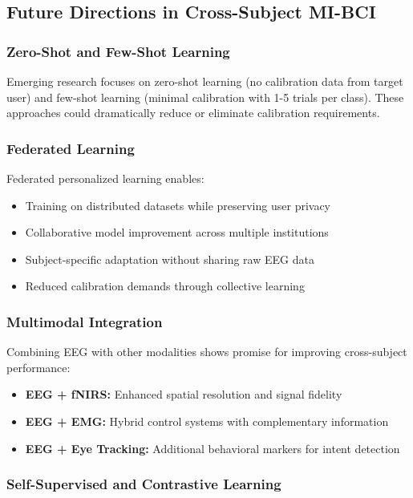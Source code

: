 \documentclass[12pt]{article}
\begin{document}
\subsection{Future Directions in Cross-Subject MI-BCI}

\subsubsection{Zero-Shot and Few-Shot Learning}

Emerging research focuses on zero-shot learning (no calibration data from target user) and few-shot learning (minimal calibration with 1-5 trials per class). These approaches could dramatically reduce or eliminate calibration requirements.

\subsubsection{Federated Learning}

Federated personalized learning enables:
\begin{itemize}
    \item Training on distributed datasets while preserving user privacy
    \item Collaborative model improvement across multiple institutions
    \item Subject-specific adaptation without sharing raw EEG data
    \item Reduced calibration demands through collective learning
\end{itemize}

\subsubsection{Multimodal Integration}

Combining EEG with other modalities shows promise for improving cross-subject performance:
\begin{itemize}
    \item \textbf{EEG + fNIRS:} Enhanced spatial resolution and signal fidelity
    \item \textbf{EEG + EMG:} Hybrid control systems with complementary information
    \item \textbf{EEG + Eye Tracking:} Additional behavioral markers for intent detection
\end{itemize}

\subsubsection{Self-Supervised and Contrastive Learning}
\end{document}
